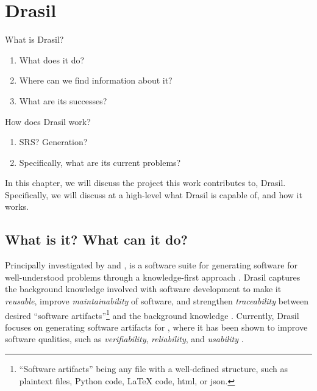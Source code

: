 \chapter{Drasil}
\label{chap:drasil}

\begin{writingdirectives}

      \item What is Drasil?
      \begin{enumerate}
            \item What does it do?
            \item Where can we find information about it?
            \item What are its successes?
      \end{enumerate}

      \item How does Drasil work?
      \begin{enumerate}
            \item SRS? Generation?
            \item Specifically, what are its current problems?
      \end{enumerate}

\end{writingdirectives}

In this chapter, we will discuss the project this work contributes to, Drasil.
Specifically, we will discuss at a high-level what Drasil is capable of, and how
it works.

\drasilLogoImg{}

\section{What is it? What can it do?}
\label{chap:drasil:sec:what-is-it-what-can-it-do}

Principally investigated by  and ,
 is a software suite
for generating software for well-understood problems through a knowledge-first
approach \cite{Drasil2021}. Drasil captures the background knowledge involved
with software development to make it \textit{reusable}, improve
\textit{maintainability} of software, and strengthen \textit{traceability}
between desired ``software artifacts''\footnote{``Software artifacts'' being any
      file with a well-defined structure, such as plaintext files, Python code,
      \LaTeX{} code, \acs{html}, or \acs{json}.} and the background knowledge
\cite{SzymczakEtAl2016}. Currently, Drasil focuses on generating software
artifacts for , where it has been shown to improve software qualities,
such as \textit{verifiability}, \textit{reliability}, and \textit{usability}
\cite{Smith2018}.

